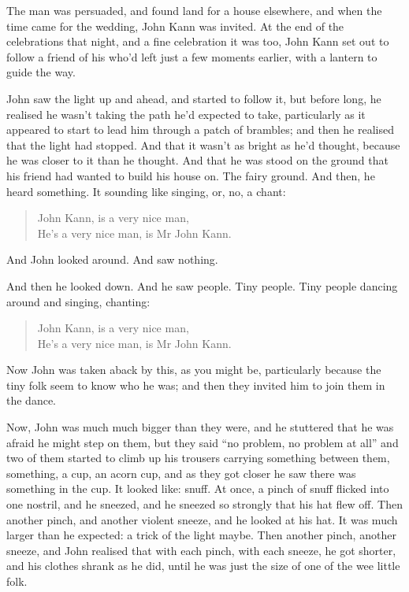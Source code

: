 \documentclass[
  12pt,
  a5paper,
  twoside]{book}
\begin{document}
The man was persuaded, and found land for a house elsewhere, and when
the time came for the wedding, John Kann was invited. At the end of the
celebrations that night, and a fine celebration it was too, John Kann
set out to follow a friend of his who'd left just a few moments earlier,
with a lantern to guide the way.

John saw the light up and ahead, and started to follow it, but before
long, he realised he wasn't taking the path he'd expected to take,
particularly as it appeared to start to lead him through a patch of
brambles; and then he realised that the light had stopped. And that it
wasn't as bright as he'd thought, because he was closer to it than he
thought. And that he was stood on the ground that his friend had wanted
to build his house on. The fairy ground. And then, he heard something.
It sounding like singing, or, no, a chant:

\begin{quote}
John Kann, is a very nice man,\\
He's a very nice man, is Mr John Kann.
\end{quote}

And John looked around. And saw nothing.

And then he looked down. And he saw people. Tiny people. Tiny people
dancing around and singing, chanting:

\begin{quote}
John Kann, is a very nice man,\\
He's a very nice man, is Mr John Kann.
\end{quote}

Now John was taken aback by this, as you might be, particularly because
the tiny folk seem to know who he was; and then they invited him to join
them in the dance.

Now, John was much much bigger than they were, and he stuttered that he
was afraid he might step on them, but they said ``no problem, no problem
at all'' and two of them started to climb up his trousers carrying
something between them, something, a cup, an acorn cup, and as they got
closer he saw there was something in the cup. It looked like: snuff. At
once, a pinch of snuff flicked into one nostril, and he sneezed, and he
sneezed so strongly that his hat flew off. Then another pinch, and
another violent sneeze, and he looked at his hat. It was much larger
than he expected: a trick of the light maybe. Then another pinch,
another sneeze, and John realised that with each pinch, with each
sneeze, he got shorter, and his clothes shrank as he did, until he was
just the size of one of the wee little folk.
\end{document}
